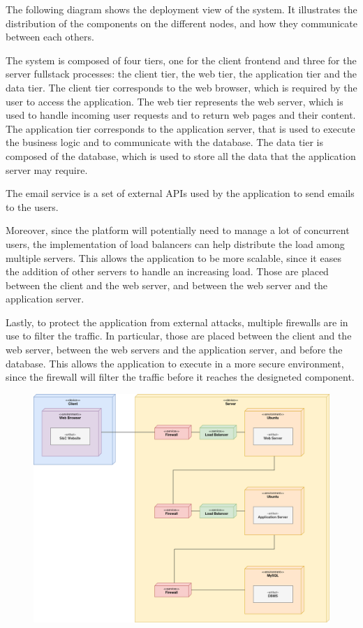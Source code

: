 The following diagram shows the deployment view of the system.
It illustrates the distribution of the components on the different nodes, and how they communicate between each others.

The system is composed of four tiers, one for the client frontend and three for the server fullstack processes: the client tier, the web tier, the application tier and the data tier.
The client tier corresponds to the web browser, which is required by the user to access the application.
The web tier represents the web server, which is used to handle incoming user requests and to return web pages and their content.
The application tier corresponds to the application server, that is used to execute the business logic and to communicate with the database.
The data tier is composed of the database, which is used to store all the data that the application server may require.

The email service is a set of external APIs used by the application to send emails to the users.

Moreover, since the platform will potentially need to manage a lot of concurrent users, the implementation of load balancers can help distribute the load among multiple servers.
This allows the application to be more scalable, since it eases the addition of other servers to handle an increasing load.
Those are placed between the client and the web server, and between the web server and the application server.

Lastly, to protect the application from external attacks, multiple firewalls are in use to filter the traffic.
In particular, those are placed between the client and the web server, between the web servers and the application server, and before the database.
This allows the application to execute in a more secure environment, since the firewall will filter the traffic before it reaches the designeted component.

\begin{figure}[H]
    \centering
    \includegraphics[width=0.8\linewidth]{../../assets/deployment-diagrams/deployment-diagram.png}
\end{figure}

